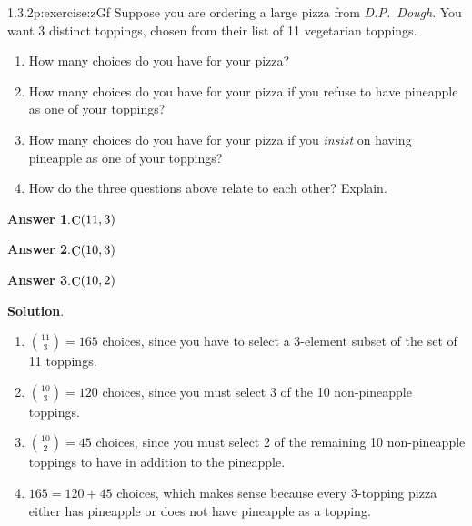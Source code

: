 \documentclass[twoside,11pt,]{book}
\newcommand{\blocktitlefont}{\relax}
\numberwithin{equation}{chapter}
\begin{document}
\begin{divisionsolution}{1.3.2}{}{p:exercise:zGf}%
Suppose you are ordering a large pizza from \emph{D.P.~Dough}. You want 3 distinct toppings, chosen from their list of 11 vegetarian toppings.%
\begin{enumerate}[label=(\alph*)]
\item{}How many choices do you have for your pizza?%
\item{}How many choices do you have for your pizza if you refuse to have pineapple as one of your toppings?%
\item{}How many choices do you have for your pizza if you \emph{insist} on having pineapple as one of your toppings?%
\item{}How do the three questions above relate to each other? Explain.%
\end{enumerate}
%
\par\smallskip%
\noindent\textbf{\blocktitlefont Answer 1}.\quad{}\(\mathop{\rm C}\nolimits\!\left(11,3\right)\)%
\par\smallskip%
\noindent\textbf{\blocktitlefont Answer 2}.\quad{}\(\mathop{\rm C}\nolimits\!\left(10,3\right)\)%
\par\smallskip%
\noindent\textbf{\blocktitlefont Answer 3}.\quad{}\(\mathop{\rm C}\nolimits\!\left(10,2\right)\)%
\par\smallskip%
\noindent\textbf{\blocktitlefont Solution}.\quad{}%
\begin{enumerate}[label=(\alph*)]
\item{}\({11 \choose 3} = 165\) choices, since you have to select a 3-element subset of the set of 11 toppings.%
\item{}\({10 \choose 3} = 120\) choices, since you must select 3 of the 10 non-pineapple toppings.%
\item{}\({10 \choose 2} = 45\) choices, since you must select 2 of the remaining 10 non-pineapple toppings to have in addition to the pineapple.%
\item{}\(165 = 120 + 45\) choices, which makes sense because every 3-topping pizza either has pineapple or does not have pineapple as a topping.%
\end{enumerate}
%
\end{divisionsolution}%
\end{document}
